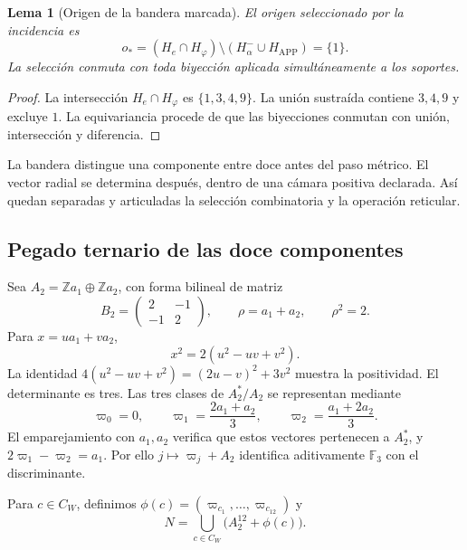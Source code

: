 \documentclass[a4paper,10pt]{article}
\newtheorem{lemma}[theorem]{Lema}
\theoremstyle{definition}\newtheorem{definition}[theorem]{Definición}
\theoremstyle{remark}\newtheorem{remark}[theorem]{Observación}
\numberwithin{equation}{section}
\begin{document}
\begin{lemma}[Origen de la bandera marcada]
\label{lem:lf-origin}
El origen seleccionado por la incidencia es
\[
 o_*=(H_e\cap H_\varphi)
                 \setminus(H_\alpha^-\cup H_{\mathrm{APP}})
     =\{1\}.
\]
La selección conmuta con toda biyección aplicada
simultáneamente a los soportes.
\end{lemma}
\begin{proof}
La intersección \(H_e\cap H_\varphi\) es
\(\{1,3,4,9\}\). La unión sustraída contiene \(3,4,9\)
y excluye \(1\). La equivariancia procede de que las
biyecciones conmutan con unión, intersección y diferencia.
\end{proof}

La bandera distingue una componente entre doce antes del
paso métrico. El vector radial se determina después,
dentro de una cámara positiva declarada. Así quedan
separadas y articuladas la selección combinatoria y la
operación reticular.

\subsection{Pegado ternario de las doce componentes}
\label{subsec:lf-glue}

Sea \(A_2=\mathbb Za_1\oplus\mathbb Za_2\), con forma
bilineal de matriz
\[
 B_2=\begin{pmatrix}2&-1\\-1&2\end{pmatrix},
 \qquad \rho=a_1+a_2,\qquad \rho^2=2.
\]
Para \(x=ua_1+va_2\),
\[
 x^2=2(u^2-uv+v^2).
\]
La identidad
\(4(u^2-uv+v^2)=(2u-v)^2+3v^2\) muestra
la positividad. El determinante es tres. Las tres
clases de \(A_2^*/A_2\) se representan mediante
\[
 \varpi_0=0,\qquad
 \varpi_1=\frac{2a_1+a_2}{3},\qquad
 \varpi_2=\frac{a_1+2a_2}{3}.
\]
El emparejamiento con \(a_1,a_2\) verifica que estos
vectores pertenecen a \(A_2^*\), y
\(2\varpi_1-\varpi_2=a_1\). Por ello
\(j\mapsto\varpi_j+A_2\) identifica aditivamente
\(\mathbb F_3\) con el discriminante.

Para \(c\in C_W\), definimos
\(\phi(c)=(\varpi_{c_1},\ldots,\varpi_{c_{12}})\)
y
\begin{equation}
 N=\bigcup_{c\in C_W}\bigl(A_2^{12}+\phi(c)\bigr).
 \label{eq:lf-glue}
\end{equation}
\end{document}
